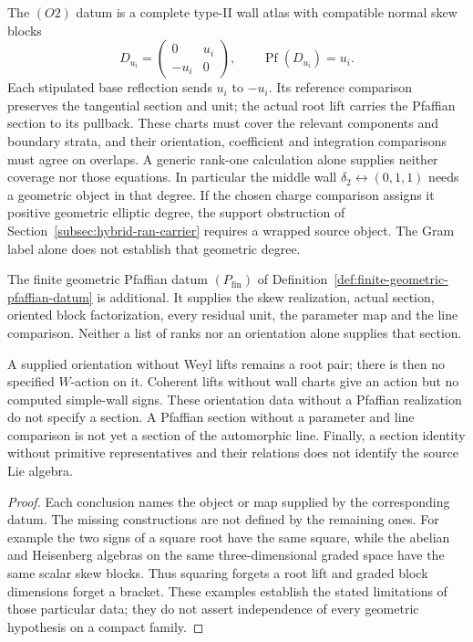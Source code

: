 The \((O2)\) datum is a complete type-II wall atlas with compatible
normal skew blocks
\[
 D_{u_i}=\begin{pmatrix}0&u_i\\-u_i&0\end{pmatrix},
 \qquad\operatorname{Pf}(D_{u_i})=u_i.
\]
Each stipulated base reflection sends \(u_i\) to \(-u_i\).
Its reference comparison preserves the tangential section and unit;
the actual root lift carries the Pfaffian section to its pullback.  These charts
must cover the relevant components and boundary strata, and their
orientation, coefficient and integration comparisons must agree on
overlaps.  A generic rank-one calculation alone supplies neither
coverage nor those equations.  In particular the middle wall
\(\delta_2\leftrightarrow(0,1,1)\) needs a geometric object in
that degree.  If the chosen charge comparison assigns it positive
geometric elliptic degree, the support obstruction of
Section~\ref{subsec:hybrid-ran-carrier} requires a wrapped source object.
The Gram label alone does not establish that geometric degree.

The finite geometric Pfaffian datum \((P_{\mathrm{fin}})\) of
Definition~\ref{def:finite-geometric-pfaffian-datum} is additional.
It supplies the skew realization, actual section, oriented block
factorization, every residual unit, the parameter map and the line
comparison.  Neither a list of ranks nor an orientation alone
supplies that section.

\begin{proposition}
\label{prop:ch6-hypothesis-deletion-residues}
A supplied orientation without Weyl lifts remains a root pair;
there is then no specified \(W\)-action on it.  Coherent lifts
without wall charts give an action but no computed simple-wall
signs.  These orientation data without a Pfaffian realization do
not specify a section.  A Pfaffian section without a parameter and
line comparison is not yet a section of the automorphic line.
Finally, a section identity without primitive representatives and
their relations does not identify the source Lie algebra.
\end{proposition}
\begin{proof}
Each conclusion names the object or map supplied by the corresponding
datum.  The missing constructions are not defined by the remaining
ones.  For example the two signs of a square root have the same
square, while the abelian and Heisenberg algebras on the same
three-dimensional graded space have the same scalar skew blocks.
Thus squaring forgets a root lift and graded block dimensions
forget a bracket.  These examples establish the stated limitations
of those particular data; they do not assert independence of every
geometric hypothesis on a compact family.
\end{proof}


